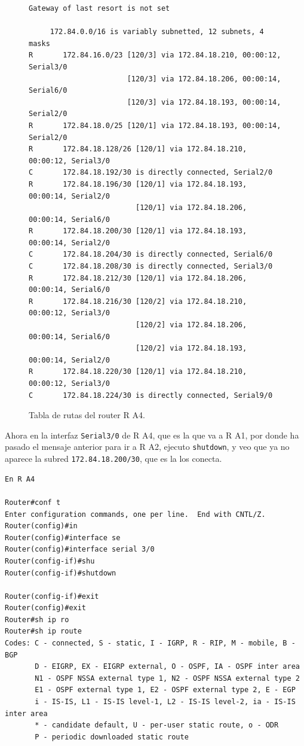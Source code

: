 \documentclass[11pt]{article}
\begin{document}
\begin{enumerate}
\begin{figure}[h]
\begin{verbatim}
Gateway of last resort is not set

     172.84.0.0/16 is variably subnetted, 12 subnets, 4 masks
R       172.84.16.0/23 [120/3] via 172.84.18.210, 00:00:12, Serial3/0
                       [120/3] via 172.84.18.206, 00:00:14, Serial6/0
                       [120/3] via 172.84.18.193, 00:00:14, Serial2/0
R       172.84.18.0/25 [120/1] via 172.84.18.193, 00:00:14, Serial2/0
R       172.84.18.128/26 [120/1] via 172.84.18.210, 00:00:12, Serial3/0
C       172.84.18.192/30 is directly connected, Serial2/0
R       172.84.18.196/30 [120/1] via 172.84.18.193, 00:00:14, Serial2/0
                         [120/1] via 172.84.18.206, 00:00:14, Serial6/0
R       172.84.18.200/30 [120/1] via 172.84.18.193, 00:00:14, Serial2/0
C       172.84.18.204/30 is directly connected, Serial6/0
C       172.84.18.208/30 is directly connected, Serial3/0
R       172.84.18.212/30 [120/1] via 172.84.18.206, 00:00:14, Serial6/0
R       172.84.18.216/30 [120/2] via 172.84.18.210, 00:00:12, Serial3/0
                         [120/2] via 172.84.18.206, 00:00:14, Serial6/0
                         [120/2] via 172.84.18.193, 00:00:14, Serial2/0
R       172.84.18.220/30 [120/1] via 172.84.18.210, 00:00:12, Serial3/0
C       172.84.18.224/30 is directly connected, Serial9/0
\end{verbatim}
\caption{Tabla de rutas del router R A4.}
\label{fig:2.1.1.4.2}
\end{figure}

Ahora en la interfaz \texttt{Serial3/0} de R A4, que es la que va a R A1, por donde ha pasado el mensaje anterior para ir a R A2, ejecuto \texttt{shutdown}, y veo que ya no aparece la subred \texttt{172.84.18.200/30}, que es la los conecta.



\begin{mdframed}
\begin{verbatim}
En R A4

Router#conf t
Enter configuration commands, one per line.  End with CNTL/Z.
Router(config)#in
Router(config)#interface se
Router(config)#interface serial 3/0
Router(config-if)#shu
Router(config-if)#shutdown 

Router(config-if)#exit
Router(config)#exit
Router#sh ip ro
Router#sh ip route 
Codes: C - connected, S - static, I - IGRP, R - RIP, M - mobile, B - BGP
       D - EIGRP, EX - EIGRP external, O - OSPF, IA - OSPF inter area
       N1 - OSPF NSSA external type 1, N2 - OSPF NSSA external type 2
       E1 - OSPF external type 1, E2 - OSPF external type 2, E - EGP
       i - IS-IS, L1 - IS-IS level-1, L2 - IS-IS level-2, ia - IS-IS inter area
       * - candidate default, U - per-user static route, o - ODR
       P - periodic downloaded static route


\end{verbatim}
\end{mdframed}
\end{enumerate}
\end{document}
